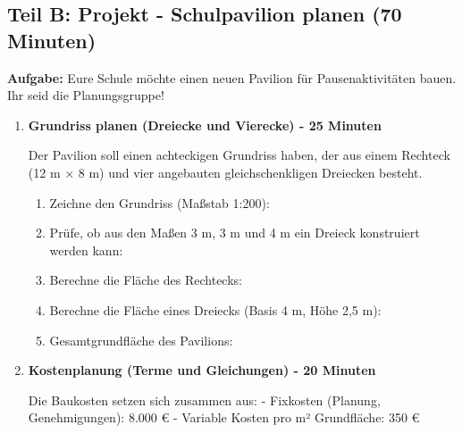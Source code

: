 \subsection*{Teil B: Projekt - Schulpavilion planen (70 Minuten)}

\textbf{Aufgabe:} Eure Schule möchte einen neuen Pavilion für Pausenaktivitäten bauen. Ihr seid die Planungsgruppe!

\begin{enumerate}[label=\arabic*.,resume]

    \item \textbf{Grundriss planen (Dreiecke und Vierecke) - 25 Minuten}

    Der Pavilion soll einen achteckigen Grundriss haben, der aus einem Rechteck (12 m × 8 m) und vier angebauten gleichschenkligen Dreiecken besteht.

    \begin{enumerate}[label=\alph*)]
        \item Zeichne den Grundriss (Maßstab 1:200):

        \vspace{6cm}

        \item Prüfe, ob aus den Maßen 3 m, 3 m und 4 m ein Dreieck konstruiert werden kann:

        \vspace{2cm}

        \item Berechne die Fläche des Rechtecks:

        \vspace{1.5cm}

        \item Berechne die Fläche eines Dreiecks (Basis 4 m, Höhe 2,5 m):

        \vspace{1.5cm}

        \item Gesamtgrundfläche des Pavilions:

        \vspace{1.5cm}

    \end{enumerate}

    \item \textbf{Kostenplanung (Terme und Gleichungen) - 20 Minuten}

    Die Baukosten setzen sich zusammen aus:
    - Fixkosten (Planung, Genehmigungen): 8.000 €
    - Variable Kosten pro m² Grundfläche: 350 €


\end{enumerate}

